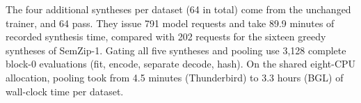 The four additional syntheses per dataset (64 in total) come from the unchanged trainer, and 64 pass. They issue 791 model requests and take 89.9 minutes of recorded synthesis time, compared with 202 requests for the sixteen greedy syntheses of SemZip-1. Gating all five syntheses and pooling use 3,128 complete block-0 evaluations (fit, encode, separate decode, hash). On the shared eight-CPU allocation, pooling took from 4.5 minutes (Thunderbird) to 3.3 hours (BGL) of wall-clock time per dataset.
